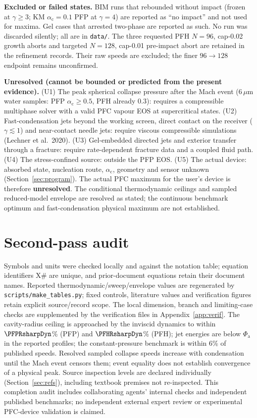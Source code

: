 \textbf{Excluded or failed states.} BIM runs that rebounded without impact (frozen at $\gamma\ge3$; KM
$\alpha_{\mathrm c}=0.1$ PFP at $\gamma=4$) are reported as ``no impact'' and not used for maxima. Gel cases that arrested
two-phase are reported as such. No run was discarded silently; all are in \texttt{data/}.
The three requested PFH $N=96$, cap-0.02 growth aborts and targeted $N=128$, cap-0.01
pre-impact abort are retained in the refinement records. Their raw speeds are excluded;
the finer $96\to128$ endpoint remains unconfirmed.

\textbf{Unresolved (cannot be bounded or predicted from the present evidence).}
(U1) The peak spherical collapse pressure after the Mach event (6\,$\mu$m water samples: PFP
$\alpha_{\mathrm c}\ge0.5$, PFH already $0.3$): requires a compressible multiphase solver with a
valid PFC vapour EOS at supercritical states. (U2) Fast-condensation jets beyond the working screen,
direct contact on the receiver ($\gamma\lesssim1$) and near-contact needle jets: require viscous
compressible simulations (Lechner et al.\ 2020). (U3) Gel-embedded directed jets and
exterior transfer through a fracture: require rate-dependent fracture data and a coupled fluid path. (U4) The
stress-confined source: outside the PFP EOS. (U5) The actual device: absorbed state, nucleation route,
$\alpha_{\mathrm c}$, geometry and sensor unknown (Section~\ref{sec:program}). The actual PFC maximum for the user's
device is therefore \textbf{unresolved}. The conditional thermodynamic ceilings and sampled reduced-model
envelope are resolved as stated; the continuous benchmark optimum and fast-condensation physical
maximum are not established.

\section{Second-pass audit}\label{sec:audit2}
Symbols and units were checked locally and against the notation table; equation identifiers X\# are unique,
and prior-document equations retain their document names. Reported thermodynamic/sweep/envelope values
are regenerated by \texttt{scripts/make\_tables.py}; fixed controls, literature values and verification
figures retain explicit source/record scope. The local dimension, branch and limiting-case checks
are supplemented by the verification files in Appendix~\ref{app:verif}.
The cavity-radius ceiling is approached by the
inviscid dynamics to within $\PFPRsharpDyn$\% (PFP) and $\PFHRsharpDyn$\% (PFH); jet energies are below
$\Phi_{\mathrm a}$ in the reported profiles; the constant-pressure benchmark is within 6\% of published speeds.
Resolved sampled collapse speeds increase with condensation until the Mach event censors them;
event equality does not establish convergence of a physical peak. Source inspection levels
are declared individually (Section~\ref{sec:refs}), including textbook premises not re-inspected.
This completion audit includes collaborating agents' internal checks and independent published
benchmarks; no independent external expert review or experimental PFC-device validation is claimed.
